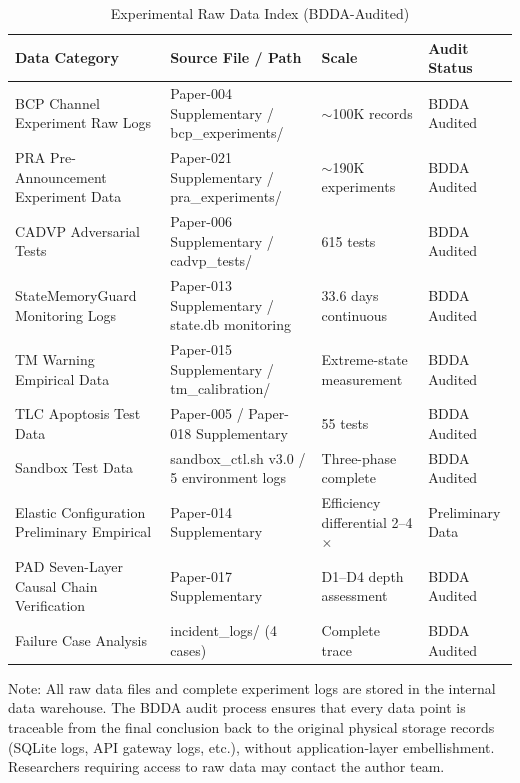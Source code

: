 \documentclass[11pt,a4paper]{article}
\begin{document}
\begin{table}[htbp]
\centering
\caption{Experimental Raw Data Index (BDDA-Audited)}
\label{tab:data-index}
\footnotesize
\begin{tabular}{p{}p{}p{}p{}}
\hline
\textbf{Data Category} & \textbf{Source File / Path} & \textbf{Scale} & \textbf{Audit Status} \\
\hline
BCP Channel Experiment Raw Logs & Paper-004 Supplementary / bcp\_experiments/ & $\sim$100K records & BDDA Audited \\
PRA Pre-Announcement Experiment Data & Paper-021 Supplementary / pra\_experiments/ & $\sim$190K experiments & BDDA Audited \\
CADVP Adversarial Tests & Paper-006 Supplementary / cadvp\_tests/ & 615 tests & BDDA Audited \\
StateMemoryGuard Monitoring Logs & Paper-013 Supplementary / state.db monitoring & 33.6 days continuous & BDDA Audited \\
TM Warning Empirical Data & Paper-015 Supplementary / tm\_calibration/ & Extreme-state measurement & BDDA Audited \\
TLC Apoptosis Test Data & Paper-005 / Paper-018 Supplementary & 55 tests & BDDA Audited \\
Sandbox Test Data & sandbox\_ctl.sh v3.0 / 5 environment logs & Three-phase complete & BDDA Audited \\
Elastic Configuration Preliminary Empirical & Paper-014 Supplementary & Efficiency differential 2--4$\times$ & Preliminary Data \\
PAD Seven-Layer Causal Chain Verification & Paper-017 Supplementary & D1--D4 depth assessment & BDDA Audited \\
Failure Case Analysis & incident\_logs/ (4 cases) & Complete trace & BDDA Audited \\
\hline
\end{tabular}
\end{table}

{\footnotesize Note: All raw data files and complete experiment logs are stored in the internal data warehouse. The BDDA audit process ensures that every data point is traceable from the final conclusion back to the original physical storage records (SQLite logs, API gateway logs, etc.), without application-layer embellishment. Researchers requiring access to raw data may contact the author team.}

\end{document}
